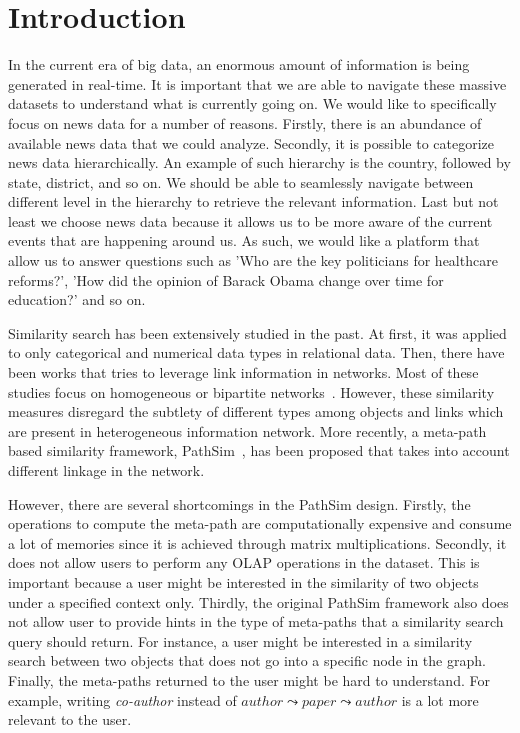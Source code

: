 \section{Introduction}
\label{sec:introduction}

In the current era of big data, an enormous amount of information is being
generated in real-time. It is important that we are able to navigate these
massive datasets to understand what is currently going on. We would like to
specifically focus on news data for a number of reasons. Firstly, there is an
abundance of available news data that we could analyze. Secondly, it is
possible to categorize news data hierarchically. An example of such hierarchy
is the country, followed by state, district, and so on. We should be able to
seamlessly navigate between different level in the hierarchy to retrieve the
relevant information. Last but not least we choose news data because it allows
us to be more aware of the current events that are happening around us. As
such, we would like a platform that allow us to answer questions such as 'Who
are the key politicians for healthcare reforms?', 'How did the opinion of
Barack Obama change over time for education?' and so on.

Similarity search has been extensively studied in the past. At first, it was
applied to only categorical and numerical data types in relational data. Then,
there have been works that tries to leverage link information in networks. Most
of these studies focus on homogeneous or bipartite
networks~\cite{page1999pagerank, jeh2002simrank, xu2007scan}. However,
these similarity measures disregard the subtlety of different types among objects and links
which are present in heterogeneous information network. More recently, a
meta-path based similarity framework, PathSim~\cite{sun2011pathsim}, has been proposed
that takes into account different linkage in the network.

However, there are several shortcomings in the PathSim design.
Firstly, the operations to compute the meta-path are computationally expensive
and consume a lot of memories since it is achieved through matrix multiplications.
Secondly, it does not allow users to perform any OLAP operations in the dataset.
This is important because a user might be interested in the similarity of two
objects under a specified context only. Thirdly, the original PathSim framework
also does not allow user to provide hints in the type of meta-paths that a similarity
search query should return. For instance, a user might be interested in a similarity
search between two objects that does not go into a specific node in the graph.
Finally, the meta-paths returned to the user might be hard to understand. For example,
writing \textit{co-author} instead of $author \leadsto paper \leadsto author$ is
a lot more relevant to the user.

